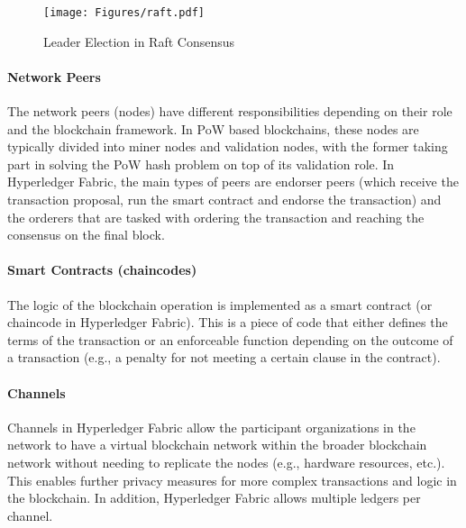 \begin{figure}
    \centering
    \texttt{[image: Figures/raft.pdf]}
    \caption{Leader Election in Raft Consensus}
    \label{fig:raft}
\end{figure}

\paragraph{Network Peers}
The network peers (nodes) have different responsibilities depending on their role and the blockchain framework. In \ac{PoW} based blockchains, these nodes are typically divided into miner nodes and validation nodes, with the former taking part in solving the \ac{PoW} hash problem on top of its validation role. In Hyperledger Fabric, the main types of peers are endorser peers (which receive the transaction proposal, run the smart contract and endorse the transaction) and the orderers that are tasked with ordering the transaction and reaching the consensus on the final block.
\paragraph{Smart Contracts (chaincodes)}
The logic of the blockchain operation is implemented as a smart contract (or chaincode in Hyperledger Fabric). This is a piece of code that either defines the terms of the transaction or an enforceable function depending on the outcome of a transaction (e.g., a penalty for not meeting a certain clause in the contract). %
\paragraph{Channels}
Channels in Hyperledger Fabric allow the participant organizations in the network to have a virtual blockchain network within the broader blockchain network without needing to replicate the nodes (e.g., hardware resources, etc.). This enables further privacy measures for more complex transactions and logic in the blockchain. In addition, Hyperledger Fabric allows multiple ledgers per channel.





